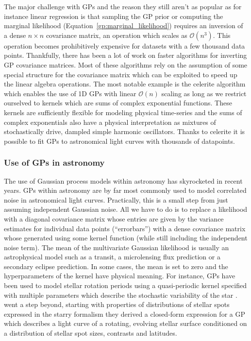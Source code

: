 \documentclass[12pt,dvipsnames]{report}
\newcommand{\ssf}[1]{\textsf{#1}}
\begin{document}
The major challenge with GPs and the reason they still aren't as popular as for
instance linear regression is that sampling the GP prior or computing the
marginal likelihood (Equation~\ref{gp:marginal_likelihood}) requires an
inversion of a dense $n\times n$ covariance matrix, an operation which scales
as $\mathcal{O}(n^3)$. This operation becomes prohibitively expensive for
datasets with a few thousand data points. Thankfully, there has been a lot of
work on faster algorithms for inverting GP covariance matrices. Most of these
algorithms rely on the assumption of some special structure for the covariance
matrix which can be exploited to speed up the linear algebra operations. The
most notable example is the \ssf{celerite} algorithm
\citep{2017AJ....154..220F} which enables the use of 1D GPs with linear
$\mathcal{O}(n)$ scaling as long as we restrict ourselved to kernels which are
sums of complex exponential functions. These kernels are sufficiently flexible
for modeling physical time-series and the sums of complex exponentials also
have a physical interpretation as mixtures of stochastically drive, dampled
simple harmonic oscillators. Thanks to \ssf{celerite} it is possible to fit
GPs to astronomical light curves with thousands of datapoints.

\subsubsection{Use of GPs in astronomy}
The use of Gaussian process models within astronomy has skyrocketed in recent
years. GPs within astronomy are by far most commonly used to model correlated
noise in astronomical light curves. Practically, this is a small step from just
assuming independent Gaussian noise. All we have to do is to replace a
likelihood with a diagonal covariance matrix whose entries are given by the
variance estimates for individual data points (``errorbars'') with a dense
covariance matrix whose generated using some kernel function (while still
including the independent noise term). The mean of the multivariate Gaussian
likelihood is usually an astrophysical model such as a transit, a microlensing
flux prediction or a secondary eclipse prediction. In some cases, the mean is
set to zero and the hyperparameters of the kernel have physical meaning. For
instance, GPs have been used to model stellar rotation periods using a
quasi-periodic kernel specified with multiple parameters which describe the
stochastic variability of the star \citep{2018MNRAS.474.2094A}.
\citet{2021AJ....162..124L} went a step beyond, starting with properties of
distributions of stellar spots expressed in the \ssf{starry} formalism they
derived a closed-form expression for a GP which describes a light curve of a
rotating, evolving stellar surface conditioned on a distribution of stellar
spot sizes, contrasts and latitudes.
\end{document}
